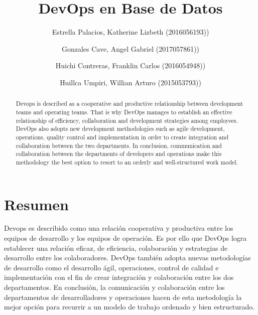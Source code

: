 \documentclass[preprint,12pt]{elsarticle}
\begin{document}
	
	\begin{frontmatter} 

		\title{\huge DevOps en Base de Datos}
		
		\author{Estrella Palacios, Katherine Lizbeth              	(2016056193))}
		\author{Gonzales Cave, Angel Gabriel              	(2017057861))}
		\author{Huichi Contreras, Franklin Carlos         	(2016054948))} 
		\author{Huillca Umpiri, Willian Arturo             		(2015053793))} 
		\address{Escuela Profesional de Ingeniería de Sistemas}
		\address{Universidad Privada de Tacna}
		\address{Tacna, Perú}
		

		\begin{abstract}
		
Devops is described as a cooperative and productive relationship between development teams and operating teams. That is why DevOps manages to establish an effective relationship of efficiency, collaboration and development strategies among employees.
DevOps also adopts new development methodologies such as agile development, operations, quality control and implementation in order to create integration and collaboration between the two departments.
In conclusion, communication and collaboration between the departments of developers and operations make this methodology the best option to resort to an orderly and well-structured work model.

		\end{abstract}


	\end{frontmatter}


\section{Resumen}

Devops es describido como una relación cooperativa y productiva entre los equipos de desarrollo y los equipos de operación. Es por ello que DevOps logra establecer una relación eficaz, de eficiencia, colaboración y estrategias de desarrollo entre los colaboradores.
DevOps también adopta nuevas metodologías de desarrollo como el desarrollo ágil, operaciones, control de calidad e implementación con el fin de crear integración y colaboración entre los dos departamentos.
En conclusión, la comunicación y colaboración entre los departamentos de desarrolladores y operaciones hacen de esta metodología la mejor opción para recurrir a un modelo de trabajo ordenado y bien estructurado.
\end{document}
